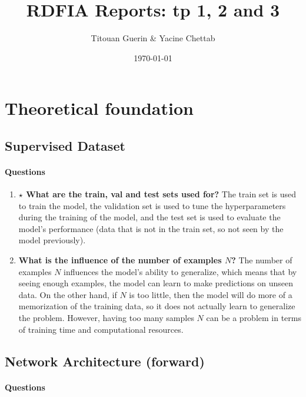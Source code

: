 \documentclass[12pt,a4paper]{article}
\title{RDFIA Reports: tp 1, 2 and 3}
\author{Titouan Guerin \& Yacine Chettab}
\begin{document}
\date{\today}
\maketitle

\section{Theoretical foundation}

\subsection{Supervised Dataset}

\paragraph{Questions} 

\begin{enumerate}
    \item \textbf{$\star$ What are the train, val and test sets used for?} \newline
    The train set is used to train the model, 
    the validation set is used to tune the hyperparameters during the training of the model, 
    and the test set is used to evaluate the model's performance 
    (data that is not in the train set, so not seen by the model previously).

    \item \textbf{What is the influence of the number of examples $N$?} \newline
    The number of examples $N$ influences the model's ability to generalize, which means that by seeing
    enough examples, the model can learn to make predictions on unseen data. On the other hand, if 
    $N$ is too little, then the model will do more of a memorization of the training data, so it does not
    actually learn to generalize the problem. However, having too many samples $N$ can be a problem in terms 
    of training time and computational resources.
\end{enumerate}

\subsection{Network Architecture (forward)}

\paragraph{Questions}
\end{document}
